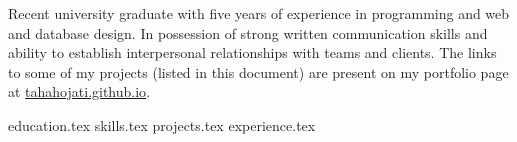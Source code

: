 \documentclass[11pt, a4paper]{awesome-cv}
\newcommand*{\sectiondir}{resume/}
\begin{document}
\makecvheader


Recent university graduate with five years of experience in programming and web and database design. In possession of strong written communication skills and ability to establish interpersonal relationships with teams and clients. The links to some of my projects (listed in this document) are present on my portfolio page at \href{http://tahahojati.github.io}{tahahojati.github.io}.  %


{education.tex}
{skills.tex}
{projects.tex}
{experience.tex}
\end{document}
